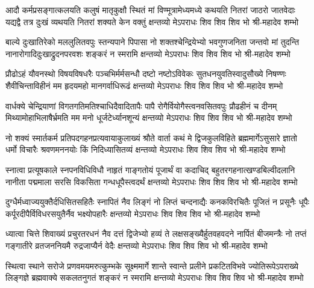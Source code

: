 \setlength{\shlokaspaceskip}{10pt}
\fourlineindentedshloka
{आदौ कर्मप्रसङ्गात्कलयति कलुषं मातृकुक्षौ स्थितं मां}
{विण्मूत्रामेध्यमध्ये कथयति नितरां जाठरो जातवेदाः}
{यद्यद्वै तत्र दुःखं व्यथयति नितरां शक्यते केन वक्तुं}
{क्षन्तव्यो मेऽपराधः शिव शिव शिव भो श्री-महादेव शम्भो} %

\fourlineindentedshloka
{बाल्ये दुःखातिरेको मललुलितवपुः स्तन्यपाने पिपासा}
{नो शक्तश्चेन्द्रियेभ्यो भवगुणजनिता जन्तवो मां तुदन्ति}
{नानारोगादिदुःखाद्रुदनपरवशः शङ्करं न स्मरामि}
{क्षन्तव्यो मेऽपराधः शिव शिव शिव भो श्री-महादेव शम्भो} %

\fourlineindentedshloka
{प्रौढोऽहं यौवनस्थो विषयविषधरैः पञ्चभिर्मर्मसन्धौ}
{दष्टो नष्टोऽविवेकः सुतधनयुवतिस्वादुसौख्ये निषण्णः}
{शैवीचिन्ताविहीनं मम हृदयमहो मानगर्वाधिरूढं}
{क्षन्तव्यो मेऽपराधः शिव शिव शिव भो श्री-महादेव शम्भो} %

\fourlineindentedshloka
{वार्धक्ये चेन्द्रियाणां विगतगतिमतिश्चाधिदैवादितापैः}
{पापै रोगैर्वियोगैस्त्वनवसितवपुः प्रौढहीनं च दीनम्}
{मिथ्यामोहाभिलाषैर्भ्रमति मम मनो धूर्जटेर्ध्यानशून्यं}
{क्षन्तव्यो मेऽपराधः शिव शिव शिव भो श्री-महादेव शम्भो} %

\fourlineindentedshloka
{नो शक्यं स्मार्तकर्म प्रतिपदगहनप्रत्यवायाकुलाख्यं}
{श्रौते वार्ता कथं मे द्विजकुलविहिते ब्रह्ममार्गेऽसुसारे}
{ज्ञातो धर्मो विचारैः श्रवणमननयोः किं निदिध्यासितव्यं}
{क्षन्तव्यो मेऽपराधः शिव शिव शिव भो श्री-महादेव शम्भो} %

\fourlineindentedshloka
{स्नात्वा प्रत्यूषकाले स्नपनविधिविधौ नाहृतं गाङ्गतोयं}
{पूजार्थं वा कदाचिद् बहुतरगहनात्खण्डबिल्वीदलानि}
{नानीता पद्ममाला सरसि विकसिता गन्धधूपैस्त्वदर्थं}
{क्षन्तव्यो मेऽपराधः शिव शिव शिव भो श्री-महादेव शम्भो} %

\fourlineindentedshloka
{दुग्धैर्मध्वाज्ययुक्तैर्दधिसितसहितैः स्नापितं नैव लिङ्गं}
{नो लिप्तं चन्दनाद्यैः कनकविरचितैः पूजितं न प्रसूनैः}
{धूपैः कर्पूरदीपैर्विविधरसयुतैर्नैव भक्ष्योपहारैः}
{क्षन्तव्यो मेऽपराधः शिव शिव शिव भो श्री-महादेव शम्भो} %

\fourlineindentedshloka
{ध्यात्वा चित्ते शिवाख्यं प्रचुरतरधनं नैव दत्तं द्विजेभ्यो}
{हव्यं ते लक्षसङ्ख्यैर्हुतवहवदने नार्पितं बीजमन्त्रैः}
{नो तप्तं गङ्गातीरे व्रतजननियमै रुद्रजाप्यैर्न वेदैः}
{क्षन्तव्यो मेऽपराधः शिव शिव शिव भो श्री-महादेव शम्भो} %

\fourlineindentedshloka
{स्थित्वा स्थाने सरोजे प्रणवमयमरुत्कुम्भके सूक्ष्ममार्गे}
{शान्ते स्वान्ते प्रलीने प्रकटितविभवे ज्योतिरूपेऽपराख्ये}
{लिङ्गज्ञे ब्रह्मवाक्ये सकलतनुगतं शङ्करं न स्मरामि}
{क्षन्तव्यो मेऽपराधः शिव शिव शिव भो श्री-महादेव शम्भो} %



